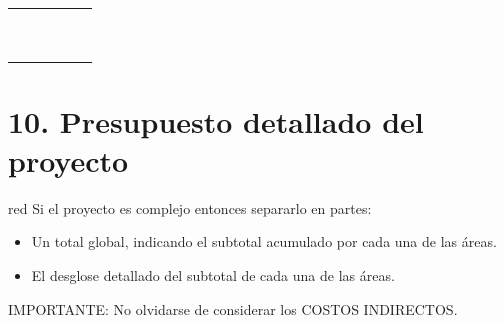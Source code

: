\documentclass[11pt]{charter}
\begin{document}
\begin{table}
\begin{tabularx}{\linewidth}{@{}|c|X|X|X|X|c|@{}}
 &  &  &  &  &  \\ \hline
 &  &  &  &  &  \\ \hline
 &  &  &  &  &  \\ \hline
 &  &  &  &  &  \\ \hline
 &  &  &  &  &  \\ \hline
 &  &  &  &  &  \\ \hline
 &  &  &  &  &  \\ \hline 
 &  &  &  &  &  \\ \hline
 &  &  &  &  &  \\ \hline
 &  &  &  &  &  \\ \hline
 &  &  &  &  &  \\ \hline

\end{tabularx}%
\end{table}


\section{10. Presupuesto detallado del proyecto}
\label{sec:presupuesto}

\begin{consigna}{red}
Si el proyecto es complejo entonces separarlo en partes:
\begin{itemize}
\item Un total global, indicando el subtotal acumulado por cada una de las áreas.
\item El desglose detallado del subtotal de cada una de las áreas.
\end{itemize}

IMPORTANTE: No olvidarse de considerar los COSTOS INDIRECTOS.

\end{consigna}
\end{document}
